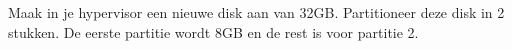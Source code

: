 Maak in je hypervisor een nieuwe disk aan van 32GB. Partitioneer deze disk in 2 stukken. De eerste partitie wordt 8GB en de rest is voor partitie 2.
